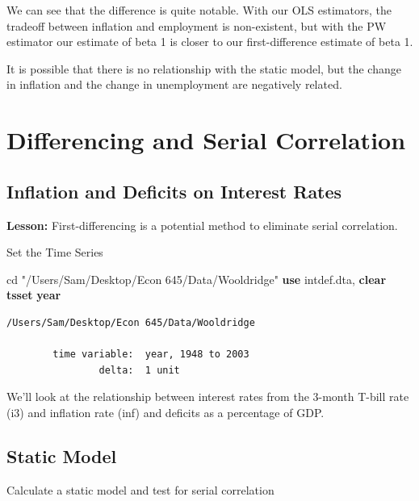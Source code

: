\documentclass[
]{book}
\newenvironment{Shaded}{\begin{snugshade}}{\end{snugshade}}
\newcommand{\FunctionTok}[1]{\textcolor[rgb]{0.13,0.29,0.53}{\textbf{#1}}}
\newcommand{\KeywordTok}[1]{\textcolor[rgb]{0.13,0.29,0.53}{\textbf{#1}}}
\newcommand{\NormalTok}[1]{#1}
\newcommand{\StringTok}[1]{\textcolor[rgb]{0.31,0.60,0.02}{#1}}
\begin{document}
We can see that the difference is quite notable. With our OLS estimators, the
tradeoff between inflation and employment is non-existent, but with the PW
estimator our estimate of beta 1 is closer to our first-difference estimate
of beta 1.

It is possible that there is no relationship with the static model, but
the change in inflation and the change in unemployment are negatively related.

\section{Differencing and Serial Correlation}\label{differencing-and-serial-correlation}

\subsection{Inflation and Deficits on Interest Rates}\label{inflation-and-deficits-on-interest-rates}

\textbf{Lesson:} First-differencing is a potential method to eliminate serial correlation.

Set the Time Series

\begin{Shaded}
\begin{Highlighting}[]
\NormalTok{cd }\StringTok{"/Users/Sam/Desktop/Econ 645/Data/Wooldridge"}
\KeywordTok{use}\NormalTok{ intdef.dta, }\KeywordTok{clear}
\KeywordTok{tsset} \FunctionTok{year}
\end{Highlighting}
\end{Shaded}

\begin{verbatim}
/Users/Sam/Desktop/Econ 645/Data/Wooldridge

        time variable:  year, 1948 to 2003
                delta:  1 unit
\end{verbatim}

We'll look at the relationship between interest rates from the 3-month T-bill rate (i3)
and inflation rate (inf) and deficits as a percentage of GDP.

\subsection*{Static Model}\label{static-model-1}

Calculate a static model and test for serial correlation
\end{document}
